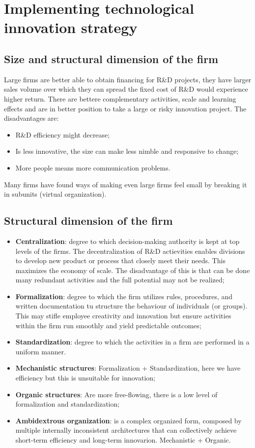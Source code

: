 \documentclass[12pt]{article}
\begin{document}
\section{Implementing technological innovation strategy}
\subsection{Size and structural dimension of the firm}
Large firms are better able to obtain financing for R\&D projects, they have larger sales volume over which they can spread the fixed cost of R\&D would experience higher return.
There are bettere complementary activities, scale and learning effects and are in better position to take a large or risky innovation project.
The disadvantages are:
\begin{itemize}
    \item R\&D efficiency might decrease;
    \item Is less innovative, the size can make less nimble and responsive to change;
    \item More people means more communication problems.
\end{itemize}

Many firms have found ways of making even large firms feel small by breaking it in subunits (virtual organization).

\subsection{Structural dimension of the firm}
\begin{itemize}
    \item \textbf{Centralization}: degree to which decision-making authority is kept at top levels of the firms.
    The decentralization of R\&D actievities enables divisions to develop new product or process that closely meet their needs.
    This maximizes the economy of scale. The disadvantage of this is that can be done many redundant activities and the full potential may not be realized;
    \item \textbf{Formalization}: degree to which the firm utilizes rules, procedures, and written documentation tu structure the behaviour of individuals (or groups). 
    This may stifle employee creativity and innovation but ensure activities within the firm run smoothly and yield predictable outcomes;
    \item \textbf{Standardization}: degree to which the activities in a firm are performed in a uniform manner. 
    \item \textbf{Mechanistic structures}: Formalization + Standardization, here we have efficiency but this is unsuitable for innovation;
    \item \textbf{Organic structures}: Are more free-flowing, there is a low level of formalization and standardization;
    \item \textbf{Ambidextrous organization}: is a complex organized form, composed by multiple internally inconsistent architectures that can collectively achieve short-term efficiency and long-term innovarion. Mechanistic + Organic.
\end{itemize}
\end{document}
